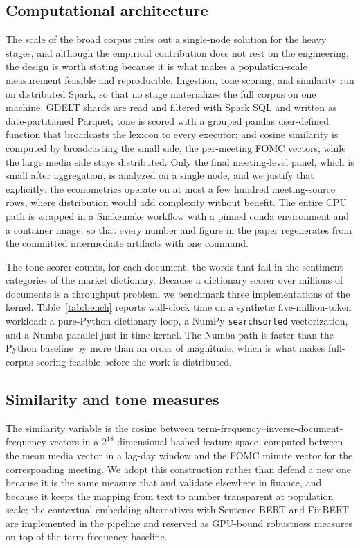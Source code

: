 \documentclass[11pt,a4paper]{article}
\begin{document}
\subsection{Computational architecture}
\label{sec:arch}

The scale of the broad corpus rules out a single-node solution for the heavy
stages, and although the empirical contribution does not rest on the engineering,
the design is worth stating because it is what makes a population-scale measurement
feasible and reproducible. Ingestion, tone scoring, and similarity run on distributed Spark,
so that no stage materializes the full corpus on one machine. GDELT shards are read
and filtered with Spark SQL and written as date-partitioned Parquet; tone is scored
with a grouped pandas user-defined function that broadcasts the lexicon to every
executor; and cosine similarity is computed by broadcasting the small side, the
per-meeting FOMC vectors, while the large media side stays distributed. Only the
final meeting-level panel, which is small after aggregation, is analyzed on a
single node, and we justify that explicitly: the econometrics operate on at most a
few hundred meeting-source rows, where distribution would add complexity without
benefit. The entire CPU path is wrapped in a Snakemake workflow with a pinned
conda environment and a container image, so that every number and figure in the
paper regenerates from the committed intermediate artifacts with one command.

The tone scorer counts, for each document, the words that fall in the sentiment
categories of the market dictionary. Because a dictionary scorer over millions of
documents is a throughput problem, we benchmark three implementations of the kernel. Table~\ref{tab:bench} reports
wall-clock time on a synthetic five-million-token workload: a pure-Python
dictionary loop, a NumPy \texttt{searchsorted} vectorization, and a Numba parallel
just-in-time kernel. The Numba path is faster than the Python baseline by more than
an order of magnitude, which is what makes full-corpus scoring feasible before the
work is distributed.

\subsection{Similarity and tone measures}

The similarity variable is the cosine between term-frequency--inverse-document-
frequency vectors in a $2^{18}$-dimensional hashed feature space, computed between
the mean media vector in a lag-day window and the FOMC minute vector for the
corresponding meeting. We adopt this construction rather than defend a new one
because it is the same measure that \citet{hoberg2016text} and \citet{cohen2020lazy}
validate elsewhere in finance, and because it keeps the mapping from text to number
transparent at population scale; the contextual-embedding alternatives with
Sentence-BERT \citep{reimers2019sentence} and FinBERT \citep{araci2019finbert} are
implemented in the pipeline and reserved as GPU-bound robustness measures on top of
the term-frequency baseline.
\end{document}
